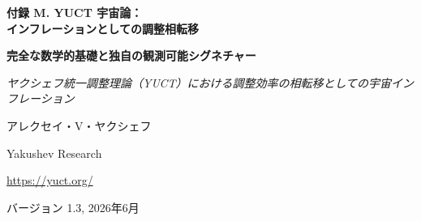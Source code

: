 \documentclass[11pt,a4paper]{article}
\theoremstyle{remark}
\newcommand{\Keff}{K_{\mathrm{eff}}}
\begin{document}
	
	\begin{titlepage}
		\centering
		\vspace*{2cm}
		
		{\Huge\bfseries 付録 M. YUCT 宇宙論：\\ インフレーションとしての調整相転移\par}
		\vspace{0.5cm}
		{\Large\bfseries 完全な数学的基礎と独自の観測可能シグネチャー\par}
		\vspace{0.3cm}
		{\large\textit{ヤクシェフ統一調整理論（YUCT）における調整効率の相転移としての宇宙インフレーション}\par}
		
		\vspace{1.5cm}
		
		{\large アレクセイ・V・ヤクシェフ\par}
		\vspace{0.3cm}
		{\normalsize Yakushev Research\par}
		\vspace{0.2cm}
		{\normalsize \url{https://yuct.org/}\par}
		
		\vspace{1.0cm}
		{\normalsize バージョン 1.3, 2026年6月\par}
		
		\vfill
		
		\begin{abstract}
			\noindent
			本付録では、ヤクシェフ統一調整理論（YUCT）の枠組みにおいて、宇宙のインフレーション段階を調整効率 $\Keff$ の相転移として完全に数学的に記述する。初期宇宙では $\Keff \ll 1$ であり、調整場 $\Psi_{MN}$ が対称相にあることが示される。冷却に伴い相転移が起こり、$\Keff$ が $\Keff \gg 1$ まで急激に増加し、基本スカラー場（インフラトン）を導入することなく指数関数的膨張（インフレーション）を生成する。有効ポテンシャルは 19 次元 YUCT ラグランジアンから導出され、辞書のフラクタル構造を継承する。普遍的誤差スケーリング指数 $\beta = 0.67$（付録 L）はインフレーションパラメータの決定に鍵となる役割を果たす。スカラースペクトル指数 $n_s$ とテンソル・スカラー比 $r$ の表式が得られ、これらはプランクデータと一致し、将来の実験（CMB‑S4、LiteBIRD、Euclid）に具体的な予測を与える。インフレーション後、調整場の凝縮体は粒子に崩壊し、宇宙に物質を満たす。この過程の効率も $\beta$ に依存し、元素合成を同じフラクタルスケーリングと結びつける。さらに、YUCT インフレーションを他のモデルと区別する独自の観測可能シグネチャーを特定する：固定された局所的非ガウス性 $f_{\text{NL}}^{\text{local}} \approx 1.12$、$f_{\text{NL}}$ と $r$ の特定の関係、バイスペクトルの特徴的な形状、テンソルパワースペクトルにおける可能な振動。インフレーションの調整的性質を検証するための実験プロトコルを提案する。
		\end{abstract}
		

\end{titlepage}
\end{document}
